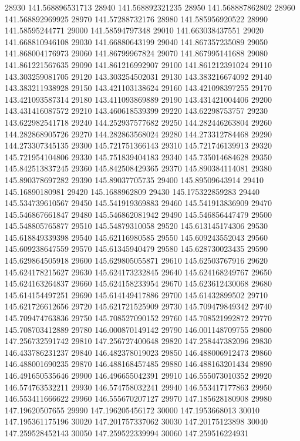 {28930 141.568896531713
28940 141.568892321235
28950 141.568887862802
28960 141.568892969925
28970 141.57288732176
28980 141.585956920522
28990 141.58595244771
29000 141.58594797348
29010 141.663038437551
29020 141.668810946108
29030 141.66880643199
29040 141.867357235089
29050 141.868004176973
29060 141.86799967824
29070 141.867995141688
29080 141.861221567635
29090 141.861216992907
29100 141.861212391024
29110 143.303259081705
29120 143.303254502031
29130 143.383216674092
29140 143.383211938928
29150 143.421103138624
29160 143.421098397255
29170 143.421093587314
29180 143.411093869889
29190 143.431421004406
29200 143.431416087572
29210 143.460618539399
29220 143.62298753757
29230 143.622982541718
29240 144.252937577682
29250 144.282446263804
29260 144.282868905726
29270 144.282863568024
29280 144.273312784468
29290 144.273307345135
29300 145.721751366143
29310 145.721746139913
29320 145.721954104806
29330 145.751839404183
29340 145.735014684628
29350 145.842513837245
29360 145.842508429365
29370 145.890384114081
29380 145.890378697282
29390 145.89037705735
29400 145.89509643914
29410 145.16890180981
29420 145.1688962809
29430 145.175322859283
29440 145.534739610567
29450 145.541919369883
29460 145.541913836909
29470 145.546867661847
29480 145.546862081942
29490 145.546856447479
29500 145.548805765877
29510 145.54879310058
29520 145.613145174306
29530 145.618849339398
29540 145.62116980585
29550 145.609243552043
29560 145.609238647559
29570 145.61345940479
29580 145.628730023435
29590 145.629864505918
29600 145.629805055871
29610 145.62503767916
29620 145.624178215627
29630 145.624173232845
29640 145.624168249767
29650 145.624163264837
29660 145.624158233954
29670 145.623612430068
29680 145.614154497251
29690 145.614149417886
29700 145.61432899502
29710 145.621726612656
29720 145.621721525909
29730 145.709479849342
29740 145.709474763836
29750 145.708527090152
29760 145.708521992872
29770 145.708703412889
29780 146.000870149142
29790 146.001148709755
29800 147.256732591742
29810 147.256727400648
29820 147.258447382096
29830 146.433786231237
29840 146.482378019023
29850 146.488006912473
29860 146.488001690235
29870 146.488168457485
29880 146.488163201434
29890 146.491650535646
29900 146.496655042391
29910 146.555073010352
29920 146.574763532211
29930 146.574758032241
29940 146.553417177863
29950 146.553411666622
29960 146.555670207127
29970 147.185628180908
29980 147.19620507655
29990 147.196205456172
30000 147.1953668013
30010 147.195361175196
30020 147.201757337062
30030 147.20175123898
30040 147.259528452143
30050 147.259522339994
30060 147.259516224931
}
